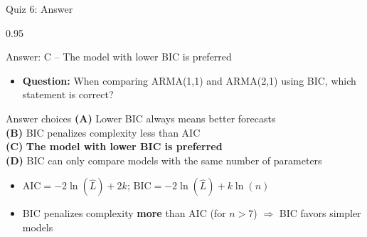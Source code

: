 \documentclass[9pt, aspectratio=169, t]{beamer}
\begin{document}
\begin{frame}{Quiz 6: Answer}
    \begin{cminipage}{0.95\textwidth}
    \begin{exampleblock}{Answer: C -- The model with lower BIC is preferred}
        \begin{itemize}\setlength{\itemsep}{0pt}
            \item \textbf{Question:} When comparing ARMA(1,1) and ARMA(2,1) using BIC, which statement is correct?
        \end{itemize}

        \vspace{0.3cm}

    \begin{block}{Answer choices}
        \textcolor{MainBlue}{\textbf{(A)}} Lower BIC always means better forecasts \incorrect\\[3pt]
        \textcolor{MainBlue}{\textbf{(B)}} BIC penalizes complexity less than AIC \incorrect\\[3pt]
        \textcolor{MainBlue}{\textbf{(C)}} \textbf{\textcolor{Forest}{The model with lower BIC is preferred}} \correct\\[3pt]
        \textcolor{MainBlue}{\textbf{(D)}} BIC can only compare models with the same number of parameters \incorrect
    \end{block}

        \vspace{0.3cm}

        \begin{itemize}
            \item $\text{AIC} = -2\ln(\hat{L}) + 2k$; \quad $\text{BIC} = -2\ln(\hat{L}) + k\ln(n)$
            \item BIC penalizes complexity \textbf{more} than AIC (for $n > 7$) $\Rightarrow$ BIC favors simpler models
        \end{itemize}
    \end{exampleblock}

    \end{cminipage}
\end{frame}
\end{document}
